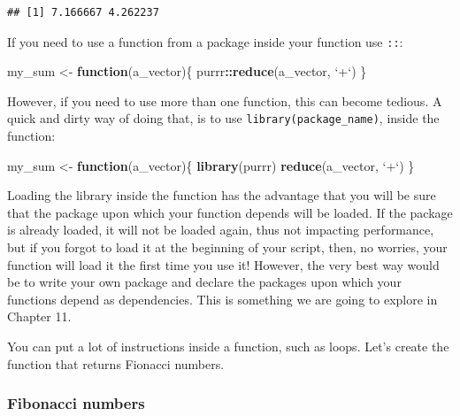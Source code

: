 \documentclass[]{gitbook}
\newenvironment{Shaded}{\begin{snugshade}}{\end{snugshade}}
\newcommand{\ControlFlowTok}[1]{\textcolor[rgb]{0.13,0.29,0.53}{\textbf{#1}}}
\newcommand{\DataTypeTok}[1]{\textcolor[rgb]{0.13,0.29,0.53}{#1}}
\newcommand{\KeywordTok}[1]{\textcolor[rgb]{0.13,0.29,0.53}{\textbf{#1}}}
\newcommand{\NormalTok}[1]{#1}
\newcommand{\OperatorTok}[1]{\textcolor[rgb]{0.81,0.36,0.00}{\textbf{#1}}}
\newcommand{\StringTok}[1]{\textcolor[rgb]{0.31,0.60,0.02}{#1}}
\theoremstyle{definition}
\theoremstyle{definition}
\theoremstyle{definition}
\theoremstyle{remark}
\begin{document}
\begin{verbatim}
## [1] 7.166667 4.262237
\end{verbatim}

If you need to use a function from a package inside your function use
\texttt{::}:

\begin{Shaded}
\begin{Highlighting}[]
\NormalTok{my_sum <-}\StringTok{ }\ControlFlowTok{function}\NormalTok{(a_vector)\{}
\NormalTok{  purrr}\OperatorTok{::}\KeywordTok{reduce}\NormalTok{(a_vector, }\StringTok{`}\DataTypeTok{+}\StringTok{`}\NormalTok{)}
\NormalTok{\}}
\end{Highlighting}
\end{Shaded}

However, if you need to use more than one function, this can become
tedious. A quick and dirty way of doing that, is to use
\texttt{library(package\_name)}, inside the function:

\begin{Shaded}
\begin{Highlighting}[]
\NormalTok{my_sum <-}\StringTok{ }\ControlFlowTok{function}\NormalTok{(a_vector)\{}
  \KeywordTok{library}\NormalTok{(purrr)}
  \KeywordTok{reduce}\NormalTok{(a_vector, }\StringTok{`}\DataTypeTok{+}\StringTok{`}\NormalTok{)}
\NormalTok{\}}
\end{Highlighting}
\end{Shaded}

Loading the library inside the function has the advantage that you will
be sure that the package upon which your function depends will be
loaded. If the package is already loaded, it will not be loaded again,
thus not impacting performance, but if you forgot to load it at the
beginning of your script, then, no worries, your function will load it
the first time you use it! However, the very best way would be to write
your own package and declare the packages upon which your functions
depend as dependencies. This is something we are going to explore in
Chapter 11.

You can put a lot of instructions inside a function, such as loops.
Let's create the function that returns Fionacci numbers.

\hypertarget{fibonacci-numbers}{%
\subsubsection{Fibonacci numbers}\label{fibonacci-numbers}}
\end{document}
